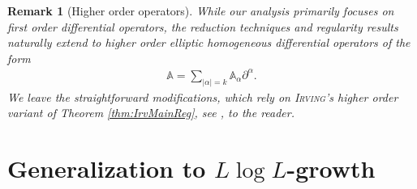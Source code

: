 \documentclass[a4paper,11pt]{amsart}
\numberwithin{equation}{section}
\newtheorem{bem}[defi]{Remark}
\begin{document}
	\begin{bem}[Higher order operators]
		While our analysis primarily focuses on first order differential operators, the reduction techniques and regularity results naturally extend to higher order elliptic homogeneous differential operators of the form 
		\begin{align*}
			\mathbb{A}=\sum_{|\alpha|=k}\mathbb{A}_{\alpha}\partial^{\alpha}.
		\end{align*}
		We leave the straightforward modifications, which rely on \textsc{Irving}'s higher order variant of Theorem \ref{thm:IrvMainReg}, see \cite{Irving2021partial}, to the reader.
	\end{bem}
	\section{Generalization to $L \log L$-growth}\label{sec:LlogL}
\end{document}

